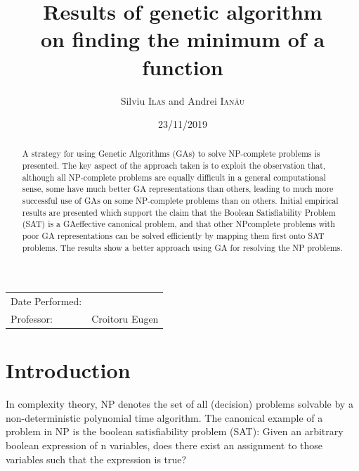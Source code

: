 \documentclass{article}
\title{Results of genetic algorithm \\ on finding the minimum of a function} %
\author{Silviu  \textsc{Ilas}  and Andrei \textsc{Ianău}} %
\begin{document}
\maketitle %

\begin{center}
\begin{tabular}{l r}
Date Performed: & \date{23/11/2019} \\ %
Professor: & Croitoru Eugen %
\end{tabular}
\end{center}



\begin{abstract}

A strategy for using Genetic Algorithms (GAs) to
solve NP-complete problems is presented. The key
aspect of the approach taken is to exploit the observation that, although all NP-complete problems are
equally difficult in a general computational sense,
some have much better GA representations than others, leading to much more successful use of GAs on
some NP-complete problems than on others.
Initial empirical results
are presented which support the claim that the
Boolean Satisfiability Problem (SAT) is a GAeffective canonical problem, and that other NPcomplete problems with poor GA representations
can be solved efficiently by mapping them first onto
SAT problems.
The results show a better approach using GA for resolving the NP problems.


\end{abstract}


\section{Introduction}
In complexity theory, NP denotes the set of all
(decision) problems solvable by a non-deterministic
polynomial time algorithm.
The canonical example of a problem in NP is the
boolean satisfiability problem (SAT): Given an arbitrary
boolean expression of n variables, does there exist an
assignment to those variables such that the expression is
true? 
\end{document}
